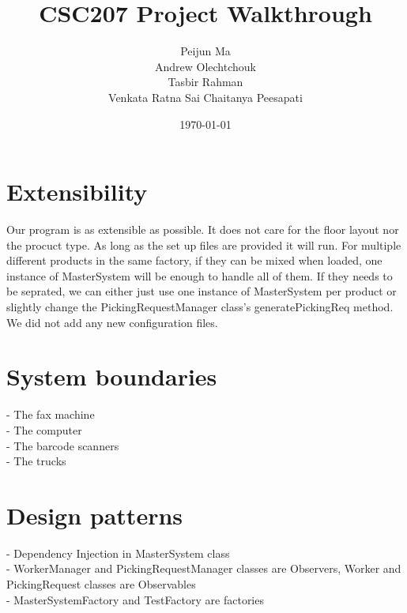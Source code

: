 \documentclass[12pt]{article}
\title{CSC207 Project Walkthrough}
\author{Peijun Ma\\Andrew Olechtchouk\\Tasbir Rahman\\Venkata Ratna Sai Chaitanya Peesapati}
\date{\today}
\begin{document}
    \maketitle
    \pagebreak

\section*{Extensibility}
    Our program is as extensible as possible. It does not care for the floor layout nor the procuct type. As long as the set up files are provided it will run. For multiple different products in the same factory, if they can be mixed when loaded, one instance of MasterSystem will be enough to handle all of them. If they needs to be seprated, we can either just use one instance of MasterSystem per product or slightly change the PickingRequestManager class's generatePickingReq method. We did not add any new configuration files.
    
\section*{System boundaries}
    - The fax machine\\
    - The computer\\
    - The barcode scanners\\
    - The trucks
    
\section*{Design patterns}
- Dependency Injection in MasterSystem class\\
- WorkerManager and PickingRequestManager classes are Observers, Worker and PickingRequest classes are Observables\\
- MasterSystemFactory and TestFactory are factories\\
\end{document}
